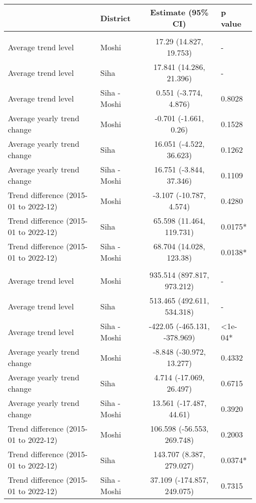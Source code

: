 \begingroup
\fontsize{12.0pt}{14.4pt}\selectfont
\begin{longtable}{l|lcl}
\toprule
 & District & Estimate (95\% CI) & p value \\ 
\midrule\addlinespace[2.5pt]
\multicolumn{4}{l}{Cancer} \\[2.5pt] 
\midrule\addlinespace[2.5pt]
Average trend level & Moshi & 17.29 (14.827, 19.753) & - \\ 
Average trend level & Siha & 17.841 (14.286, 21.396) & - \\ 
Average trend level & Siha - Moshi & 0.551 (-3.774, 4.876) & 0.8028 \\ 
Average yearly trend change & Moshi & -0.701 (-1.661, 0.26) & 0.1528 \\ 
Average yearly trend change & Siha & 16.051 (-4.522, 36.623) & 0.1262 \\ 
Average yearly trend change & Siha - Moshi & 16.751 (-3.844, 37.346) & 0.1109 \\ 
Trend difference (2015-01 to 2022-12) & Moshi & -3.107 (-10.787, 4.574) & 0.4280 \\ 
Trend difference (2015-01 to 2022-12) & Siha & 65.598 (11.464, 119.731) & 0.0175* \\ 
Trend difference (2015-01 to 2022-12) & Siha - Moshi & 68.704 (14.028, 123.38) & 0.0138* \\ 
\midrule\addlinespace[2.5pt]
\multicolumn{4}{l}{Cardiovascular Diseases} \\[2.5pt] 
\midrule\addlinespace[2.5pt]
Average trend level & Moshi & 935.514 (897.817, 973.212) & - \\ 
Average trend level & Siha & 513.465 (492.611, 534.318) & - \\ 
Average trend level & Siha - Moshi & -422.05 (-465.131, -378.969) & <1e-04* \\ 
Average yearly trend change & Moshi & -8.848 (-30.972, 13.277) & 0.4332 \\ 
Average yearly trend change & Siha & 4.714 (-17.069, 26.497) & 0.6715 \\ 
Average yearly trend change & Siha - Moshi & 13.561 (-17.487, 44.61) & 0.3920 \\ 
Trend difference (2015-01 to 2022-12) & Moshi & 106.598 (-56.553, 269.748) & 0.2003 \\ 
Trend difference (2015-01 to 2022-12) & Siha & 143.707 (8.387, 279.027) & 0.0374* \\ 
Trend difference (2015-01 to 2022-12) & Siha - Moshi & 37.109 (-174.857, 249.075) & 0.7315 \\ 

\end{longtable}
